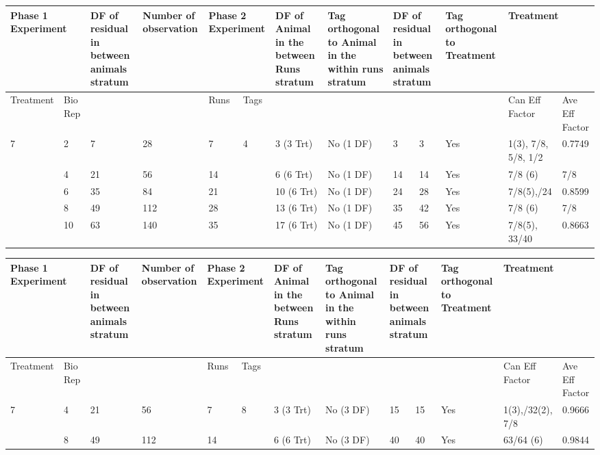 \begin{tabular}{|p{0.5in}|p{0.3in}|p{0.7in}|p{0.7in}|p{0.3in}|p{0.3in}|p{0.7in}|p{0.7in}|p{0.2in}|p{0.4in}|p{0.6in}|p{0.5in}|p{0.4in}|} \hline 
\multicolumn{2}{|p{1in}|}{Phase 1 Experiment} & DF of residual in between animals stratum & Number of observation  & \multicolumn{2}{|p{0.7in}|}{Phase 2 Experiment} & DF of Animal in the between Runs stratum  & Tag orthogonal to Animal in the within runs stratum & \multicolumn{2}{|p{0.6in}|}{DF of residual in between animals stratum} & Tag orthogonal to Treatment & \multicolumn{2}{|p{0.9in}|}{Treatment} \\ \hline 
Treatment & Bio Rep &  &  & Runs & Tags  &  &  & \multicolumn{2}{|p{0.6in}|}{} &  & Can Eff Factor & Ave Eff Factor \\ \hline 
7 & 2 & 7 & 28 & 7 & 4 & 3 (3 Trt) & No (1 DF) & 3 & 3 & Yes & 1(3), 7/8, 5/8, 1/2 & 0.7749 \\ \hline 
 & 4 & 21 & 56 & 14 &  & 6 (6 Trt) & No (1 DF) & 14 & 14 & Yes & 7/8 (6) & 7/8 \\ \hline 
 & 6 & 35 & 84 & 21 &  & 10 (6 Trt) & No (1 DF) & 24 & 28 & Yes & 7/8(5),\newline 19/24 & 0.8599 \\ \hline 
 & 8 & 49 & 112 & 28 &  & 13 (6 Trt) & No (1 DF) & 35 & 42 & Yes & 7/8 (6) & 7/8 \\ \hline 
 & 10 & 63 & 140 & 35 &  & 17 (6 Trt) & No (1 DF) & 45 & 56 & Yes & 7/8(5), 33/40 & 0.8663 \\ \hline 
\end{tabular}



\noindent 

\begin{tabular}{|p{0.5in}|p{0.3in}|p{0.7in}|p{0.7in}|p{0.3in}|p{0.3in}|p{0.7in}|p{0.7in}|p{0.3in}|p{0.3in}|p{0.6in}|p{0.5in}|p{0.4in}|} \hline 
\multicolumn{2}{|p{1in}|}{Phase 1 Experiment} & DF of residual in between animals stratum & Number of observation  & \multicolumn{2}{|p{0.7in}|}{Phase 2 Experiment} & DF of Animal in the between Runs stratum  & Tag orthogonal to Animal in the within runs stratum & \multicolumn{2}{|p{0.6in}|}{DF of residual in between animals stratum} & Tag orthogonal to Treatment & \multicolumn{2}{|p{0.9in}|}{Treatment} \\ \hline 
Treatment & Bio Rep &  &  & Runs & Tags  &  &  & \multicolumn{2}{|p{0.6in}|}{} &  & Can Eff Factor & Ave Eff Factor \\ \hline 
7 & 4 & 21\newline  & 56 & 7 & 8 & 3 (3 Trt) & No (3 DF) & 15 & 15 & Yes & 1(3),\newline 31/32(2), 7/8 & 0.9666 \\ \hline 
 & 8 & 49 & 112 & 14 &  & 6 (6 Trt) & No (3 DF) & 40 & 40 & Yes & 63/64 (6)\newline  & 0.9844 \\ \hline 
\end{tabular}



